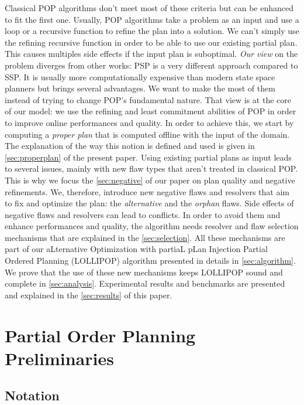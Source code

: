 Classical POP algorithms don't meet most of these criteria but can be
enhanced to fit the first one. Usually, POP algorithms take a problem as
an input and use a loop or a recursive function to refine the plan into
a solution. We can't simply use the refining recursive function in order
to be able to use our existing partial plan. This causes multiples side
effects if the input plan is suboptimal. \emph{Our view} on the problem
diverges from other works: PSP is a very different approach compared to
SSP. It is usually more computationally expensive than modern state
space planners but brings several advantages. We want to make the most
of them instead of trying to change POP's fundamental nature. That view
is at the core of our model: we use the refining and least commitment
abilities of POP in order to improve online performances and quality. In
order to achieve this, we start by computing a \emph{proper plan} that
is computed offline with the input of the domain. The explanation of the
way this notion is defined and used is given in \cref{sec:properplan} of
the present paper. Using existing partial plans as input leads to
several issues, mainly with new flaw types that aren't treated in
classical POP. This is why we focus the \cref{sec:negative} of our paper
on plan quality and negative refinements. We, therefore, introduce new
negative flaws and resolvers that aim to fix and optimize the plan: the
\emph{alternative} and the \emph{orphan} flaws. Side effects of negative
flaws and resolvers can lead to conflicts. In order to avoid them and
enhance performances and quality, the algorithm needs resolver and flaw
selection mechanisms that are explained in the \cref{sec:selection}. All
these mechanisms are part of our aLternative Optimization with partiaL
pLan Injection Partial Ordered Planning (LOLLIPOP) algorithm presented
in details in \cref{sec:algorithm}. We prove that the use of these new
mechanisms keeps LOLLIPOP sound and complete in \cref{sec:analysis}.
Experimental results and benchmarks are presented and explained in the
\cref{sec:results} of this paper.

\section{Partial Order Planning
Preliminaries}\label{partial-order-planning-preliminaries}

\subsection{Notation}\label{notation}

